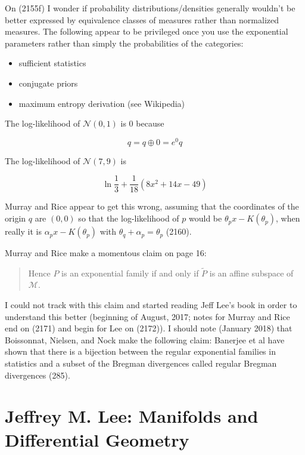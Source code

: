 \documentclass[12pt]{article}
\begin{document}
On (2155f) I wonder if probability distributions/densities generally
wouldn't be better expressed by equivalence classes of measures rather
than normalized measures. The following appear to be privileged once
you use the exponential parameters rather than simply the
probabilities of the categories:

\begin{itemize}
\item sufficient statistics
\item conjugate priors
\item maximum entropy derivation (see Wikipedia)
\end{itemize}

The log-likelihood of $\mathcal{N}(0,1)$ is 0 because

\begin{equation}
  \label{eq:ohghaeng}
  q=q\oplus{}0=e^{0}q
\end{equation}

The log-likelihood of $\mathcal{N}(7,9)$ is 

\begin{equation}
  \label{eq:aiwahief}
  \ln\frac{1}{3}+\frac{1}{18}(8x^{2}+14x-49)
\end{equation}

Murray and Rice appear to get this wrong, assuming that the
coordinates of the origin $q$ are $(0,0)$ so that the log-likelihood
of $p$ would be $\theta_{p}x-K(\theta_{p})$, when really it is
$\alpha_{p}x-K(\theta_{p})$ with $\theta_{q}+\alpha_{p}=\theta_{p}$
(2160).

Murray and Rice make a momentous claim on page 16:

\begin{quote}
  Hence $P$ is an exponential family if and only if $\tilde{P}$ is an
  affine subspace of $\mathcal{M}$.
\end{quote}

I could not track with this claim and started reading Jeff Lee's book
in order to understand this better (beginning of August, 2017; notes
for Murray and Rice end on (2171) and begin for Lee on (2172)). I
should note (January 2018) that Boissonnat, Nielsen, and Nock make the
following claim: Banerjee et al have shown that there is a bijection
between the regular exponential families in statistics and a subset of
the Bregman divergences called regular Bregman divergences (285).

\section{Jeffrey M. Lee: Manifolds and Differential Geometry}
\label{lee}
\end{document}
